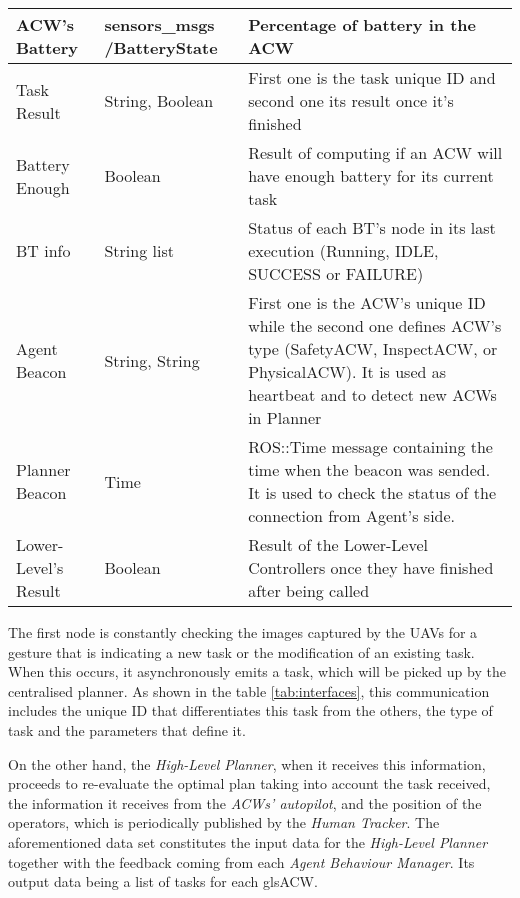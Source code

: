 \begin{table}[htb]
\begin{tabular}{|p{}|p{}|p{}|}
      \gls{ACW}'s Battery & sensors\_msgs /BatteryState & Percentage of battery in the \gls{ACW} \\ \hline

	  Task Result & String, Boolean & First one is the task unique \gls{ID} and second one its result once it's finished \\ \hline
      
      Battery Enough & Boolean & Result of computing if an \gls{ACW} will have enough battery for its current task \\ \hline

	  \gls{BT} info & String list & Status of each \gls{BT}'s node in its last execution (Running, IDLE, SUCCESS or FAILURE) \\ \hline
      
      Agent Beacon & String, String & First one is the \gls{ACW}'s unique ID while the second one defines \gls{ACW}'s type (SafetyACW, InspectACW, or PhysicalACW). It is used as heartbeat and to detect new \glspl{ACW} in Planner \\ \hline

	  Planner Beacon & Time & ROS::Time message containing the time when the beacon was sended. It is used to check the status of the connection from Agent's side. \\ \hline
      
      Lower-Level's Result & Boolean & Result of the Lower-Level Controllers once they have finished after being called \\ \hline
      
    \end{tabular}
\end{table}

The first node is constantly checking the images captured by the \glspl{UAV} for a gesture that is indicating a new task or the modification of an existing task. When this occurs, it asynchronously emits a task, which will be picked up by the centralised planner. As shown in the table \ref{tab:interfaces}, this communication includes the unique \gls{ID} that differentiates this task from the others, the type of task and the parameters that define it.

On the other hand, the \emph{High-Level Planner}, when it receives this information, proceeds to re-evaluate the optimal plan taking into account the task received, the information it receives from the \emph{\glspl{ACW}' autopilot}, and the position of the operators, which is periodically published by the \emph{Human Tracker}. The aforementioned data set constitutes the input data for the \emph{High-Level Planner} together with the feedback coming from each \emph{Agent Behaviour Manager}. Its output data being a list of tasks for each gls{ACW}.

